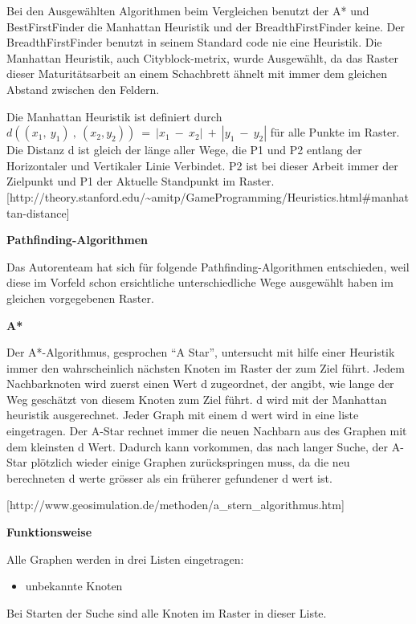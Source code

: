 Bei den Ausgewählten Algorithmen beim Vergleichen benutzt der A* und
BestFirstFinder die Manhattan Heuristik und der BreadthFirstFinder
keine. Der BreadthFirstFinder benutzt in seinem Standard code nie eine
Heuristik. Die Manhattan Heuristik, auch Cityblock-metrix, wurde
Ausgewählt, da das Raster dieser Maturitätsarbeit an einem Schachbrett
ähnelt mit immer dem gleichen Abstand zwischen den Feldern.

Die Manhattan Heuristik ist definiert durch
\(d((x_{1},\ y_{1})\ ,\ (x_{2},y_{2}))\  = \ |x_{1}\  - \ x_{2}|\  + \ |y_{1}\  - \ y_{2}|\)
für alle Punkte im Raster. Die Distanz d ist gleich der länge aller
Wege, die P1 und P2 entlang der Horizontaler und Vertikaler Linie
Verbindet. P2 ist bei dieser Arbeit immer der Zielpunkt und P1 der
Aktuelle Standpunkt im Raster.
{[}http://theory.stanford.edu/\textasciitilde{}amitp/GameProgramming/Heuristics.html\#manhattan-distance{]}

\textbf{Pathfinding-Algorithmen}

Das Autorenteam hat sich für folgende Pathfinding-Algorithmen
entschieden, weil diese im Vorfeld schon ersichtliche unterschiedliche
Wege ausgewählt haben im gleichen vorgegebenen Raster.

\textbf{A*}

Der A*-Algorithmus, gesprochen ``A Star'', untersucht mit hilfe einer
Heuristik immer den wahrscheinlich nächsten Knoten im Raster der zum
Ziel führt. Jedem Nachbarknoten wird zuerst einen Wert d zugeordnet, der
angibt, wie lange der Weg geschätzt von diesem Knoten zum Ziel führt. d
wird mit der Manhattan heuristik ausgerechnet. Jeder Graph mit einem d
wert wird in eine liste eingetragen. Der A-Star rechnet immer die neuen
Nachbarn aus des Graphen mit dem kleinsten d Wert. Dadurch kann
vorkommen, das nach langer Suche, der A-Star plötzlich wieder einige
Graphen zurückspringen muss, da die neu berechneten d werte grösser als
ein früherer gefundener d wert ist.

{[}http://www.geosimulation.de/methoden/a\_stern\_algorithmus.htm{]}

\textbf{Funktionsweise}

Alle Graphen werden in drei Listen eingetragen:

\begin{itemize}
\item
  unbekannte Knoten
\end{itemize}

Bei Starten der Suche sind alle Knoten im Raster in dieser Liste.

